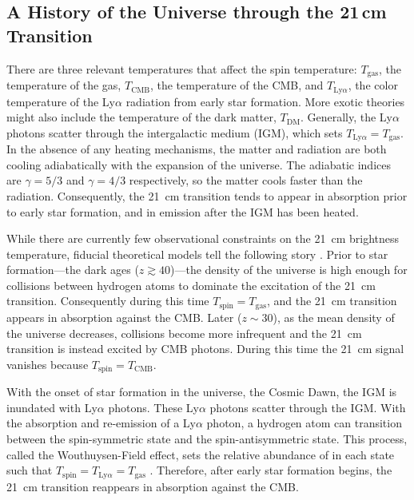 \begin{bibunit}
\section{A History of the Universe through the 21\,cm Transition}

There are three relevant temperatures that affect the spin temperature: $T_\text{gas}$, the
temperature of the gas, $T_\text{CMB}$, the temperature of the CMB, and $T_{\text{Ly}\alpha}$, the
color temperature of the Ly$\alpha$ radiation from early star formation. More exotic theories might
also include the temperature of the dark matter, $T_\text{DM}$. Generally,  the Ly$\alpha$ photons
scatter through the intergalactic medium (IGM), which sets $T_{\text{Ly}\alpha} = T_\text{gas}$. In
the absence of any heating mechanisms, the matter and radiation are both cooling adiabatically with
the expansion of the universe.  The adiabatic indices are $\gamma = 5/3$ and $\gamma = 4/3$
respectively, so the matter cools faster than the radiation. Consequently, the 21~cm transition
tends to appear in absorption prior to early star formation, and in emission after the IGM has been
heated.

While there are currently few observational constraints on the 21~cm brightness temperature,
fiducial theoretical models tell the following story \citep[e.g.,][]{2006PhR...433..181F,
2012RPPh...75h6901P}.  Prior to star formation---the dark ages ($z \gtrsim 40$)---the density of the
universe is high enough for collisions between hydrogen atoms to dominate the excitation of the
21~cm transition.  Consequently during this time $T_\text{spin} = T_\text{gas}$, and the 21~cm
transition appears in absorption against the CMB.  Later ($z \sim 30$), as the mean density of the
universe decreases, collisions become more infrequent and the 21~cm transition is instead excited by
CMB photons. During this time the 21~cm signal vanishes because $T_\text{spin} = T_\text{CMB}$.

With the onset of star formation in the universe, the Cosmic Dawn, the IGM is inundated with
Ly$\alpha$ photons.  These Ly$\alpha$ photons scatter through the IGM. With the absorption and
re-emission of a Ly$\alpha$ photon, a hydrogen atom can transition between the spin-symmetric state
and the spin-antisymmetric state. This process, called the Wouthuysen-Field effect, sets the
relative abundance of  in each state such that $T_\text{spin} = T_{\text{Ly}\alpha} =
T_\text{gas}$ \citep{1952AJ.....57R..31W,1958PIRE...46..240F}. Therefore, after early star formation
begins, the 21~cm transition reappears in absorption against the CMB.


\end{bibunit}
